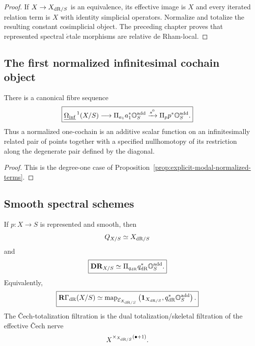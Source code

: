 \begin{proof}
If \(X\to X_{\mathrm{dR}/S}\) is an equivalence, its effective image is \(X\) and every iterated relation
term is \(X\) with identity simplicial operators.  Normalize and totalize the resulting constant
cosimplicial object.  The preceding chapter proves that represented spectral
\(\acute{e}\)tale morphisms are relative de Rham-local.
\end{proof}

\subsection{The first normalized infinitesimal cochain object}

\begin{proposition}
\label{prop:monadic-de-rham-first-form}
There is a canonical fibre sequence
\[
\boxed{
    \underline{\Omega_{\mathrm{inf}}}^{\,1}(X/S)
    \longrightarrow
    \Pi_{a_1}a_1^*\mathbb O_S^{\mathrm{add}}
    \xrightarrow{s^0}
    \Pi_p p^*\mathbb O_S^{\mathrm{add}}.
}
\]
Thus a normalized one-cochain is an additive scalar function on an infinitesimally related pair of
points together with a specified nullhomotopy of its restriction along the degenerate pair defined by
the diagonal.
\end{proposition}

\begin{proof}
This is the degree-one case of Proposition~\ref{prop:explicit-modal-normalized-terms}.
\end{proof}

\subsection{Smooth spectral schemes}

\begin{proposition}
\label{prop:monadic-de-rham-smooth-test}
If \(p:X\to S\) is represented and smooth, then
\[
    Q_{X/S}\simeq X_{\mathrm{dR}/S}
\]
and
\[
\boxed{
    \mathbf{DR}_{X/S}
    \simeq
    \Pi_{q_{\mathrm{dR}}}q_{\mathrm{dR}}^*\mathbb O_S^{\mathrm{add}}.
}
\]
Equivalently,
\[
\boxed{
    \mathbf R\Gamma_{\mathrm{dR}}(X/S)
    \simeq
    \operatorname{map}_{\mathcal E_{X_{\mathrm{dR}/S}}}
    \left(
        \mathbf 1_{X_{\mathrm{dR}/S}},
        q_{\mathrm{dR}}^*\mathbb O_S^{\mathrm{add}}
    \right).
}
\]
The \v{C}ech-totalization filtration is the dual totalization/skeletal filtration of the effective \v{C}ech nerve
\[
    X^{\times_{X_{\mathrm{dR}/S}}(\bullet+1)}.
\]
\end{proposition}

